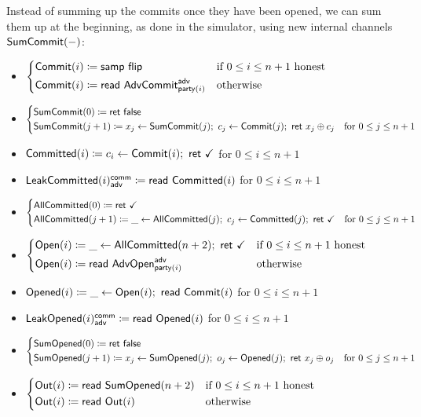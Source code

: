 \noindent Instead of summing up the commits once they have been opened, we can sum them up at the beginning, as done in the simulator, using new internal channels $\mathsf{SumCommit}(-)$:

\begin{itemize}
\item {\color{blue} $\begin{cases*} \Commit(i) \coloneqq \samp{\flip} & \text{if $0 \leq i \leq n+1$ honest} \\ \Commit(i) \coloneqq \read{\AdvCommit^\adv_{\party(i)}} & \text{otherwise} \end{cases*}$}
\item {\color{blue} $\begin{cases*} \SumCommit(0) \coloneqq \ret{\false} & \\ \SumCommit(j+1) \coloneqq x_j \leftarrow \SumCommit(j); \ c_j \leftarrow \Commit(j); \ \ret{x_j \oplus c_j} & \text{for $0 \leq j \leq n+1$} \end{cases*}$}
\item {\color{magenta} $\mathsf{Committed}(i) \coloneqq c_i \leftarrow \mathsf{Commit}(i); \ \mathsf{ret} \ \checkmark$ for $0 \leq i \leq n+1$}
\item {\color{magenta} $\mathsf{LeakCommitted}(i)^{\mathsf{comm}}_{\mathsf{adv}} \coloneqq \mathsf{read} \ \mathsf{Committed}(i)$ for $0 \leq i \leq n+1$}
\item {\color{magenta} $\begin{cases*} \AllCommitted(0) \coloneqq \ret{\checkmark} & \\ \AllCommitted(j+1) \coloneqq \_ \leftarrow \AllCommitted(j); \ c_j \leftarrow \Committed(j); \ \ret{\checkmark} & \text{for $0 \leq j \leq n+1$} \end{cases*}$}
\item {\color{teal} $\begin{cases*} \Open(i) \coloneqq \_ \leftarrow \AllCommitted(n+2); \ \ret{\checkmark} & \text{if $0 \leq i \leq n+1$ honest} \\ \Open(i) \coloneqq \read{\AdvOpen^\adv_{\party(i)}} & \text{otherwise} \end{cases*}$}
\item {\color{red} $\mathsf{Opened}(i) \coloneqq \_ \leftarrow \mathsf{Open}(i); \ \mathsf{read} \ \mathsf{Commit}(i)$ for $0 \leq i \leq n+1$}
\item {\color{red} $\mathsf{LeakOpened}(i)^{\mathsf{comm}}_{\mathsf{adv}} \coloneqq \mathsf{read} \ \mathsf{Opened}(i)$ for $0 \leq i \leq n+1$}
\item {\color{red} $\begin{cases*} \SumOpened(0) \coloneqq \ret{\false} & \\ \SumOpened(j+1) \coloneqq x_j \leftarrow \SumOpened(j); \ o_j \leftarrow \Opened(j); \ \ret{x_j \oplus o_j} & \text{for $0 \leq j \leq n+1$} \end{cases*}$}
\item $\begin{cases*} \Out(i) \coloneqq \read{\SumOpened(n+2)} & \text{if $0 \leq i \leq n+1$ honest} \\ \Out(i) \coloneqq \read{\Out(i)} & \text{otherwise} \end{cases*}$
\end{itemize}

